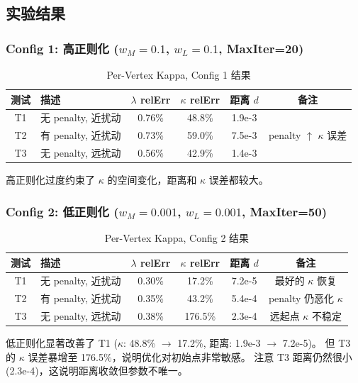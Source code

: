 \documentclass[12pt,a4paper]{article}
\begin{document}
\subsection{实验结果}

\subsubsection{Config 1: 高正则化 ($w_M=0.1$, $w_L=0.1$, MaxIter=20)}

\begin{table}[H]
\centering
\caption{Per-Vertex Kappa, Config 1 结果}
\begin{tabular}{clcccc}
\toprule
测试 & 描述 & $\lambda$ relErr & $\kappa$ relErr & 距离 $d$ & 备注 \\
\midrule
T1 & 无 penalty, 近扰动 & 0.76\% & 48.8\% & 1.9e-3 & \\
T2 & 有 penalty, 近扰动 & 0.73\% & 59.0\% & 7.5e-3 & penalty $\uparrow$ $\kappa$ 误差 \\
T3 & 无 penalty, 远扰动 & 0.56\% & 42.9\% & 1.4e-3 & \\
\bottomrule
\end{tabular}
\end{table}

高正则化过度约束了 $\kappa$ 的空间变化，距离和 $\kappa$ 误差都较大。

\subsubsection{Config 2: 低正则化 ($w_M=0.001$, $w_L=0.001$, MaxIter=50)}

\begin{table}[H]
\centering
\caption{Per-Vertex Kappa, Config 2 结果}
\begin{tabular}{clcccc}
\toprule
测试 & 描述 & $\lambda$ relErr & $\kappa$ relErr & 距离 $d$ & 备注 \\
\midrule
T1 & 无 penalty, 近扰动 & 0.30\% & 17.2\% & 7.2e-5 & 最好的 $\kappa$ 恢复 \\
T2 & 有 penalty, 近扰动 & 0.35\% & 43.2\% & 5.4e-4 & penalty 仍恶化 $\kappa$ \\
T3 & 无 penalty, 远扰动 & 0.38\% & 176.5\% & 2.3e-4 & 远起点 $\kappa$ 不稳定 \\
\bottomrule
\end{tabular}
\end{table}

低正则化显著改善了 T1 ($\kappa$: 48.8\% $\to$ 17.2\%, 距离: 1.9e-3 $\to$ 7.2e-5)。
但 T3 的 $\kappa$ 误差暴增至 176.5\%，说明优化对初始点非常敏感。
注意 T3 距离仍然很小 (2.3e-4)，这说明距离收敛但参数不唯一。
\end{document}
